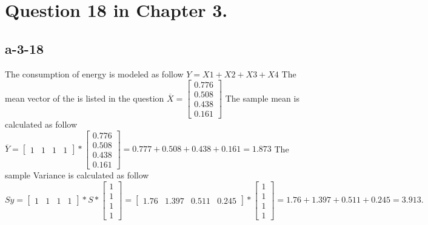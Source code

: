 \documentclass{article}
\begin{document}
\section{Question 18 in Chapter 3.}
\subsection{a-3-18}
The consumption of energy is modeled as follow \newline
$Y= X{1} + X{2}+ X{3} + X{4}$\newline
The mean vector of the is listed in the question\newline 
$\overline{X}= \left[
\begin{array}{c}
0.776 \\
0.508\\
0.438\\ 
0.161
\end{array}
\right]$\newline
The sample mean is calculated as follow\newline
$\overline{Y}= \left[ 
\begin{array}{cccc}
1&1&1&1 
\end{array}
\right] * \left[
\begin{array}{c}
0.776 \\
0.508\\
0.438\\ 
0.161
\end{array}
\right]
= 0.777 + 0.508 + 0.438 + 0.161 = 1.873 $\newline 
The sample Variance is calculated as follow \newline
$S{y} = \left[ 
\begin{array}{cccc}
1&1&1&1 
\end{array}
\right] * S * \left [
\begin{array}{c} 
1\\
1\\ 
1\\ 
1
\end{array}
\right]=\left[ 
\begin{array}{cccc} 
1.76 & 1.397 & 0.511 & 0. 245 
\end{array}
\right] *\left [
\begin{array}{c} 
1\\
1\\ 
1\\ 
1
\end{array}
\right]= 1.76 + 1.397 + 0.511 + 0.245 = 3.913.$ 
\end{document}
